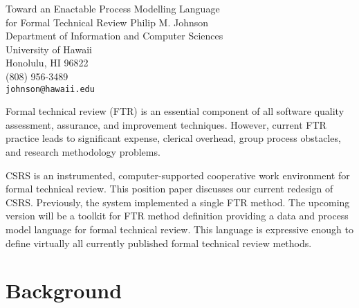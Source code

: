 





\makeieeetitle
  {Toward an Enactable Process Modelling Language\\
           for Formal Technical Review}
  {Philip M. Johnson\\
   Department of Information and Computer Sciences\\
   University of Hawaii\\
   Honolulu, HI 96822\\
   (808) 956-3489\\
   {\tt johnson@hawaii.edu}}

   
   \makeieeeabstract 
   {
   Formal technical review (FTR) is an essential
   component of all software quality assessment, assurance, and
   improvement techniques.  However, current FTR practice leads to
   significant expense, clerical overhead, group process obstacles, and
   research methodology problems.
  
   CSRS is an instrumented, computer-supported cooperative work
   environment for formal technical review.  This position paper
   discusses our current redesign of CSRS. Previously, the system
   implemented a single FTR method.  The upcoming version will be a
   toolkit for FTR method definition providing a data and process model
   language for formal technical review. This language is expressive
   enough to define virtually all currently published formal technical
   review methods.}



\section{Background}

